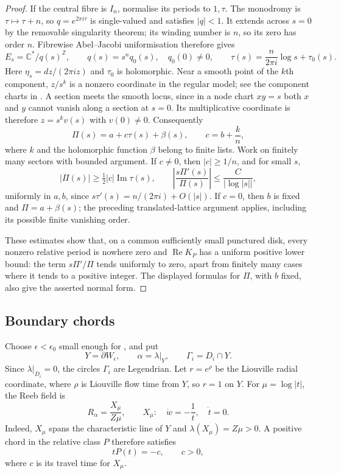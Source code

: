 \documentclass[a4paper]{amsart}
\newcommand{\ZZ}{\mathbb{Z}}
\newcommand{\C}{\mathbb{C}}
\DeclareMathOperator{\Ree}{Re}
\renewcommand{\Im}{\operatorname{Im}}
\numberwithin{equation}{section}
\begin{document}
\begin{proof}
If the central fibre is $I_n$, normalise its periods to $1,\tau$.
The monodromy is $\tau\mapsto\tau+n$, so $q=e^{2\pi i\tau}$ is
single-valued and satisfies $|q|<1$. It extends across $s=0$ by
the removable singularity theorem; its winding number is $n$, so
its zero has order $n$. Fibrewise Abel--Jacobi uniformisation
\cite[Sections~2.1 and 2.3]{UlmerUrzua} therefore gives
\[
 E_s=\C^*/q(s)^\ZZ,\qquad q(s)=s^nq_0(s),\quad q_0(0)\ne0,
 \qquad \tau(s)=\frac{n}{2\pi i}\log s+\tau_0(s).
\]
Here $\eta_s=dz/(2\pi iz)$ and $\tau_0$ is holomorphic. Near a
smooth point of the $k$th component, $z/s^k$ is a nonzero coordinate
in the regular model; see the component charts in
\cite[proof of Proposition~3.5]{UlmerUrzua}. A section meets the smooth
locus, since in a node chart $xy=s$ both $x$ and $y$ cannot vanish
along a section at $s=0$. Its multiplicative coordinate is therefore
$z=s^k v(s)$ with $v(0)\ne0$. Consequently
\[
 \Pi(s)=a+c\tau(s)+\beta(s),\qquad c=b+\frac{k}{n},
\]
where $k$ and the holomorphic function $\beta$ belong to finite
lists. Work on finitely many sectors with bounded argument. If
$c\ne0$, then $|c|\ge1/n$, and for small $s$,
\[
 |\Pi(s)|\ge\tfrac12|c|\Im\tau(s),\qquad
 \left|\frac{s\Pi'(s)}{\Pi(s)}\right|
 \le\frac{C}{|\log|s||},
\]
uniformly in $a,b$, since $s\tau'(s)=n/(2\pi i)+O(|s|)$.
If $c=0$, then $b$ is fixed and $\Pi=a+\beta(s)$; the preceding
translated-lattice argument applies, including its possible finite
vanishing order.

These estimates show that, on a common sufficiently small punctured
disk, every nonzero relative period is nowhere zero and $\Ree K_P$
has a uniform positive lower bound: the term $s\Pi'/\Pi$ tends uniformly
to zero, apart from finitely many cases where it tends to a positive
integer. The displayed formulas for $\Pi$, with $b$ fixed, also give
the asserted normal form.
\end{proof}

\subsection{Boundary chords}

Choose $\epsilon<\epsilon_0$ small enough for
, and put
\[
 Y=\partial W_\epsilon,\qquad \alpha=\lambda|_Y,
 \qquad \Gamma_i=D_i\cap Y.
\]
Since $\lambda|_{D_i}=0$, the circles $\Gamma_i$ are Legendrian.
Let $r=e^\rho$ be the Liouville radial coordinate, where $\rho$ is
Liouville flow time from $Y$, so $r=1$ on $Y$.
For $\mu=\log|t|$, the Reeb field is
\begin{equation}\label{eq:boundary-reeb}
 R_\alpha=\frac{X_\mu}{Z\mu},\qquad
 X_\mu:\quad \dot w=-\frac1t,\quad \dot t=0.
\end{equation}
Indeed, $X_\mu$ spans the characteristic line of $Y$ and
$\lambda(X_\mu)=Z\mu>0$. A positive chord in the relative class
$P$ therefore satisfies
\begin{equation}\label{eq:boundary-chord}
 tP(t)=-c,\qquad c>0,
\end{equation}
where $c$ is its travel time for $X_\mu$.
\end{document}
